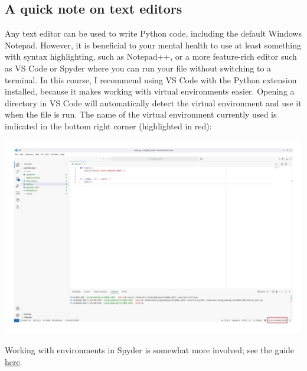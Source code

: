 \subsection{A quick note on text editors}
Any text editor can be used to write Python code, including the default Windows Notepad. However, it is beneficial to your mental health to use at least something with syntax highlighting, such as Notepad++, or a more feature-rich editor such as VS Code or Spyder where you can run your file without switching to a terminal. In this course, I recommend using VS Code with the Python extension installed, because it makes working with virtual environments easier. Opening a directory in VS Code will automatically detect the virtual environment and use it when the file is run. The name of the virtual environment currently used is indicated in the bottom right corner (highlighted in red):
\begin{center}
    \includegraphics[width=0.9\linewidth]{vscode.png}
\end{center}

Working with environments in Spyder is somewhat more involved; see the guide \href{https://github.com/spyder-ide/spyder/wiki/Working-with-packages-and-environments-in-Spyder#working-with-other-environments-and-python-installations}{here}.

